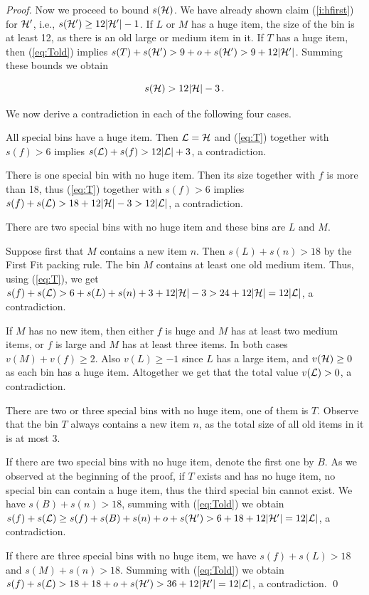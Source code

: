 \begin{proof}
Now we proceed to bound $s({\mathcal H})$. We have already shown claim
(\ref{i:hfirst}) for ${\mathcal H}'$, i.e., $s({\mathcal H}')\geq12|{\mathcal H}'|-1$. If $L$ or
$M$ has a huge item, the size of the bin is at least 12, as there is
an old large or medium item in it. If $T$ has a huge item, then
(\ref{eq:Told}) implies $s(T)+s({\mathcal H}')>9+
o+s({\mathcal H}')>9+12|{\mathcal H}'|$. Summing these bounds we obtain

\begin{equation}
s({\mathcal H}) > 12|{\mathcal H}|-3 \,. \label{eq:T}
\end{equation}
 
We now derive a contradiction in each of the following four cases.

 All special bins have a huge item.  Then
${\mathcal L}={\mathcal H}$ and (\ref{eq:T}) together with $s(f)>6$ implies
$s({\mathcal L})+s(f)>12|{\mathcal L}|+3$, a contradiction.

 There is one special bin with no huge item.  Then its
size together with $f$ is more than 18, thus (\ref{eq:T}) together
with $s(f)>6$ implies $s(f)+s({\mathcal L})>18+12|{\mathcal H}|-3>12|{\mathcal L}|$, a
contradiction.

 There are two special bins with no huge item and these
bins are $L$ and $M$.

Suppose first that $M$ contains a new item $n$. Then $s(L)+s(n)>18$ by
the First Fit packing rule. The bin $M$ contains at least one old
medium item.  Thus, using (\ref{eq:T}), we get
$s(f)+s({\mathcal L})>6+s(L)+s(n)+3+12|{\mathcal H}|-3> 24+ 12|{\mathcal H}|=12|{\mathcal L}|$, a
contradiction.

If $M$ has no new item, then either $f$ is huge and $M$ has at least
two medium items, or $f$ is large and $M$ has at least three items. In
both cases $v(M)+v(f)\geq 2$. Also $v(L)\geq -1$ since $L$ has a large
item, and $v({\mathcal H})\geq0$ as each bin has a huge item. Altogether we
get that the total value $v({\mathcal L})>0$, a contradiction.

 There are two or three special bins with no huge
item, one of them is $T$. Observe that the bin $T$ always contains a
new item $n$, as the total size of all old items in it is at most $3$. 

If there are two special bins with no huge item, denote the first one by
$B$. As we observed at the beginning of the proof, if $T$ exists and
has no huge item, no special bin can contain a huge item, thus the
third special bin cannot exist. We have
$s(B)+s(n)>18$, summing with (\ref{eq:Told}) we obtain
$s(f)+s({\mathcal L})\geq
s(f)+s(B)+s(n)+o+s({\mathcal H}')>6+18+12|{\mathcal H}'|=12|{\mathcal L}|$, a contradiction.

If there are three special bins with no huge item, we have
$s(f)+s(L)>18$ and $s(M)+s(n)>18$. Summing with (\ref{eq:Told}) we
obtain $s(f)+s({\mathcal L})>18+18+o+s({\mathcal H}')>36+12|{\mathcal H}'|=12|{\mathcal L}|$, a
contradiction.
\qed
\end{proof}

